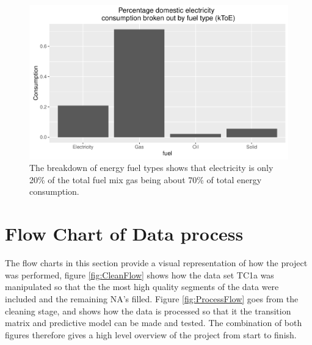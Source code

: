 \begin{figure}
    \centering
    \includegraphics[width =\textwidth]{Figures/Appendix/DomElConsumFuel}
    \caption[Energy consumption by fuel type]{The breakdown of energy fuel types shows that electricity is only 20\% of the total fuel mix gas being about 70\% of total energy consumption.}
    \label{fig:DomElConsumFuel}
\end{figure}

\iffalse
\chapter{Flow Chart of Data process}
The flow charts in this section provide a visual representation of how the project was performed, figure \ref{fig:CleanFlow} shows how the data set TC1a was manipulated so that the the most high quality segments of the data were included and the remaining NA's filled. Figure \ref{fig:ProcessFlow} goes from the cleaning stage, and shows how the data is processed so that it the transition matrix and predictive model can be made and tested. The combination of both figures therefore gives a high level overview of the project from start to finish.

